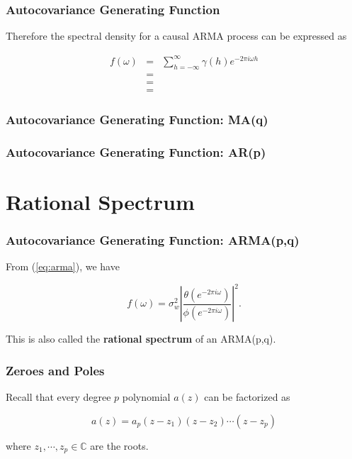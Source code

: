 \documentclass[%
xcolor=pdftex]{beamer}
\begin{document}
\begin{frame}
\frametitle{Autocovariance Generating Function}

Therefore the spectral density for a causal ARMA process can be expressed as

\begin{eqnarray} \label{eq:arma}
f(\omega) &=& \sum_{h=-\infty}^{\infty} \gamma(h) e^{-2 \pi i \omega h} \nonumber \\
          &=& \nonumber \\
          &=& \nonumber \\
          &=&
\end{eqnarray}

\end{frame}

\begin{frame}
\frametitle{Autocovariance Generating Function: MA(q)}


\end{frame}

\begin{frame}
\frametitle{Autocovariance Generating Function: AR(p)}


\end{frame}

\section{Rational Spectrum}
\frame{\tableofcontents[currentsection]}

\begin{frame}
\frametitle{Autocovariance Generating Function: ARMA(p,q)}


From (\ref{eq:arma}), we have

\begin{equation*} 
f(\omega) = \sigma_w^2 \left \lvert \frac{\theta(e^{-2 \pi i \omega})}{\phi(e^{-2 \pi i \omega})} \right \rvert ^2.
\end{equation*}

This is also called the \textbf{rational spectrum} of an ARMA(p,q).


\end{frame}

\begin{frame}
\frametitle{Zeroes and Poles}

Recall that every degree $p$ polynomial $a(z)$ can be factorized as

$$
a(z) = a_p(z-z_1)(z-z_2)\cdots(z-z_p)
$$

where $z_1, \cdots, z_p \in \mathbb{C}$ are the roots.

\end{frame}
\end{document}
